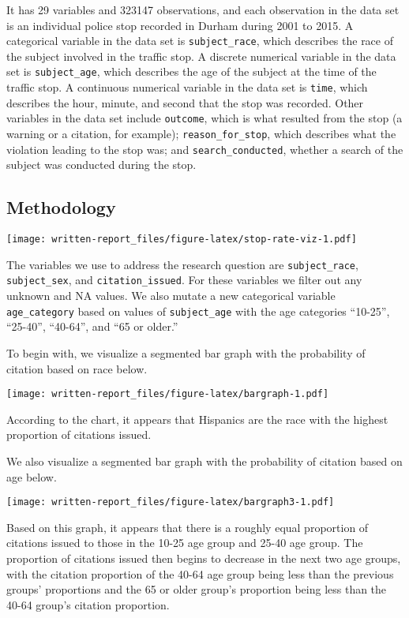 \documentclass[
]{article}
\begin{document}
It has 29 variables and 323147 observations, and each observation in the
data set is an individual police stop recorded in Durham during 2001 to
2015. A categorical variable in the data set is \texttt{subject\_race},
which describes the race of the subject involved in the traffic stop. A
discrete numerical variable in the data set is \texttt{subject\_age},
which describes the age of the subject at the time of the traffic stop.
A continuous numerical variable in the data set is \texttt{time}, which
describes the hour, minute, and second that the stop was recorded. Other
variables in the data set include \texttt{outcome}, which is what
resulted from the stop (a warning or a citation, for example);
\texttt{reason\_for\_stop}, which describes what the violation leading
to the stop was; and \texttt{search\_conducted}, whether a search of the
subject was conducted during the stop.

\hypertarget{methodology}{%
\subsection{Methodology}\label{methodology}}

\texttt{[image: written-report\_files/figure-latex/stop-rate-viz-1.pdf]}

The variables we use to address the research question are
\texttt{subject\_race}, \texttt{subject\_sex}, and
\texttt{citation\_issued}. For these variables we filter out any unknown
and NA values. We also mutate a new categorical variable
\texttt{age\_category} based on values of \texttt{subject\_age} with the
age categories ``10-25'', ``25-40'', ``40-64'', and ``65 or older.''

To begin with, we visualize a segmented bar graph with the probability
of citation based on race below.

\texttt{[image: written-report\_files/figure-latex/bargraph-1.pdf]}

According to the chart, it appears that Hispanics are the race with the
highest proportion of citations issued.

We also visualize a segmented bar graph with the probability of citation
based on age below.

\texttt{[image: written-report\_files/figure-latex/bargraph3-1.pdf]}

Based on this graph, it appears that there is a roughly equal proportion
of citations issued to those in the 10-25 age group and 25-40 age group.
The proportion of citations issued then begins to decrease in the next
two age groups, with the citation proportion of the 40-64 age group
being less than the previous groups' proportions and the 65 or older
group's proportion being less than the 40-64 group's citation
proportion.
\end{document}
